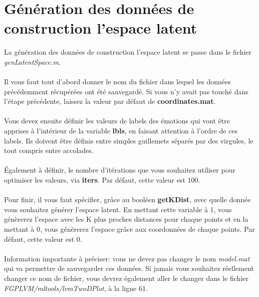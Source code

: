 \documentclass[poster]{polytech/polytech}
\begin{document}
\section{Génération des données de construction l'espace latent}
La génération des données de construction l'espace latent se passe dans le fichier \textit{genLatentSpace.m}.\\
\\
Il vous faut tout d'abord donner le nom du fichier dans lequel les données précédemment récupérées ont été sauvegardé. Si vous n'y avait pas touché dans l'étape précédente, laissez la valeur par défaut de \textbf{coordinates.mat}.\\
\\
Vous devez ensuite définir les valeurs de labels des émotions qui vont être apprises à l'intérieur de la variable \textbf{lbls}, en faisant attention à l'ordre de ces labels. Ils doivent être définis entre simples guillemets séparés par des virgules, le tout compris entre accolades.\\
\\
Également à définir, le nombre d'itérations que vous souhaitez utiliser pour optimiser les valeurs, via \textbf{iters}. Par défaut, cette valeur est 100.\\
\\
Pour finir, il vous faut spécifier, grâce au booléen \textbf{getKDist}, avec quelle donnée vous souhaitez générer l'espace latent. En mettant cette variable à 1, vous génèrerez l'espace avec les K plus proches distances pour chaque points et en la mettant à 0, vous génèrerez l'espace grâce aux coordonnées de chaque points. Par défaut, cette valeur est 0.\\
\\
Information importante à préciser: vous ne devez pas changer le nom \textit{model.mat} qui va permettre de sauvegarder ces données. Si jamais vous souhaitez réellement changer ce nom de fichier, vous devrez également aller le changer dans le fichier \textit{FGPLVM/mltools/lvmTwoDPlot}, à la ligne 61.

\newpage
\end{document}
